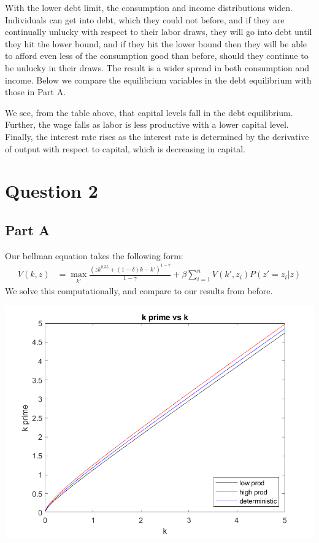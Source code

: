\documentclass[11pt]{article} %
\begin{document}
With the lower debt limit, the consumption and income distributions widen. Individuals can get into debt, which they could not before, and if they are continually unlucky with respect to their labor draws, they will go into debt until they hit the lower bound, and if they hit the lower bound then they will be able to afford even less of the consumption good than before, should they continue to be unlucky in their draws. The result is a wider spread in both consumption and income. Below we compare the equilibrium variables in the debt equilibrium with those in Part A.

\begin{center}

\end{center}

We see, from the table above, that capital levels fall in the debt equilibrium. Further, the wage falls as labor is less productive with a lower capital level. Finally, the interest rate rises as the interest rate is determined by the derivative of output with respect to capital, which is decreasing in capital.

\section{Question 2}
\subsection{Part A}
Our bellman equation takes the following form:
\begin{align*}
V(k,z) &= \max_{k'} \frac{(zk^{0.35}+(1-\delta)k - k')^{1-\gamma}}{1-\gamma} + \beta\sum_{i=1}^n V(k',z_i)P(z' = z_i|z)
\end{align*}
 We solve this computationally, and compare to our results from before.

\includegraphics{q2k}
\end{document}
